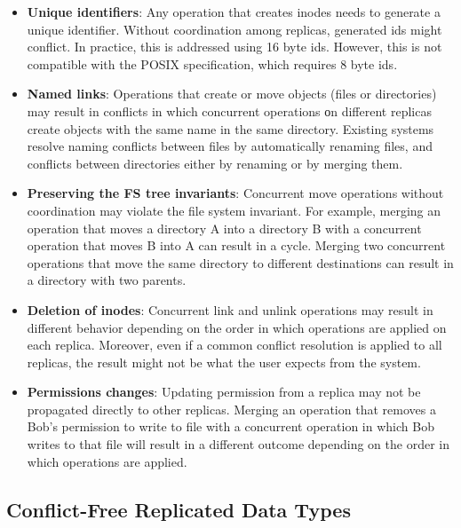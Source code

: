 \documentclass[sigconf,anonymous,10pt]{acmart}
\begin{document}
\begin{itemize}
	\item \textbf{Unique identifiers}: Any operation that creates
	inodes needs to generate a unique identifier.
	Without coordination among replicas, generated ids might conflict.
	In practice, this is addressed using 16 byte ids.
	However, this is not compatible with the POSIX specification, which requires 8 byte ids.
	\item \textbf{Named links}: Operations that create or move objects (files or directories)
	may result in conflicts in which concurrent operations οn different replicas create
	objects with the same name in the same directory.
	Existing systems resolve naming conflicts between files by automatically renaming
  files, and conflicts between directories either by renaming or by merging them.
	\item \textbf{Preserving the FS tree invariants}: Concurrent move
	operations without coordination may violate the file system invariant.
  For example, merging an operation that moves a directory A into a
	directory B with a concurrent operation that moves B into A can result in a cycle.
  Merging two concurrent operations that move the same directory
	to different destinations can result in a directory with two parents.
  \item \textbf{Deletion of inodes}: Concurrent link and unlink operations may result in different behavior depending on the order in which operations are applied on each replica.
  Moreover, even if a common conflict resolution is applied to all replicas, the
  result might not be what the user expects from the system.
  \item \textbf{Permissions changes}: Updating permission from a replica may not
  be propagated directly to other replicas.
  Merging an operation that removes a Bob's permission to write to file with a
  concurrent operation in which Bob writes
  to that file will result in a different outcome depending on the order in which
  operations are applied.
\end{itemize}

\subsection{Conflict-Free Replicated Data Types}
\end{document}
